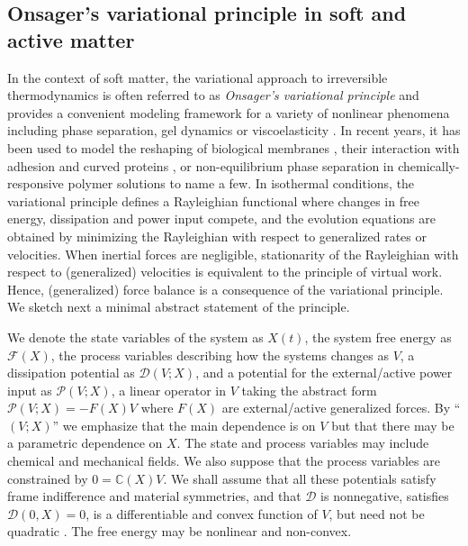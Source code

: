 \documentclass[12pt]{iopart}
\begin{document}
\subsection{Onsager's variational principle in soft and active matter}
\label{Ons_summ}
	
In the context of soft matter, the  variational approach to irreversible thermodynamics is often referred to as \emph{Onsager's variational principle}  and provides a convenient modeling framework for a variety of nonlinear phenomena including phase separation, gel dynamics or viscoelasticity \cite{doi2011}. In recent years, it has been used to model the reshaping of biological membranes \cite{arroyo2009,arroyo2018}, their interaction with adhesion and curved proteins \cite{kaurin-bal,Tozzi_2019}, or non-equilibrium phase separation in chemically-responsive polymer solutions \cite{10.1122/8.0000475} to name a few. In isothermal conditions, the variational principle defines a Rayleighian functional where changes in free energy, dissipation and power input compete, and the evolution equations are obtained by minimizing the Rayleighian with respect to generalized rates or velocities. When inertial forces are negligible, stationarity of the Rayleighian with respect to (generalized) velocities is equivalent to the principle of virtual work. Hence, (generalized) force balance is a consequence of the variational principle. We sketch next a minimal abstract statement of the principle.
	
	We denote the state variables of the system as $X(t)$, the system free energy as $\mathcal{F}(X)$, the process variables describing how the systems changes as $V$, a dissipation potential as $\mathcal{D}(V;X)$, and a potential for the external/active power input as $\mathcal{P}(V;X)$,  a linear operator in $V$ taking the abstract form $\mathcal{P}(V;X) = -F(X) V$ where $F(X)$ are external/active generalized forces. By ``$(V;X)$'' we emphasize that the main dependence is on $V$ but that there may be a parametric dependence on $X$. The state and process variables may include chemical and mechanical fields. We also suppose that the process variables are constrained by $0 = \mathbb{C}(X) V$. We shall assume that all these potentials satisfy frame indifference and material symmetries, and that $\mathcal{D}$ is nonnegative, satisfies $\mathcal{D}(0,X) = 0$, is a differentiable and convex function of $V$, but need not be quadratic \cite{EDELEN1972481}. The free energy may be nonlinear and non-convex. 
	
\end{document}
